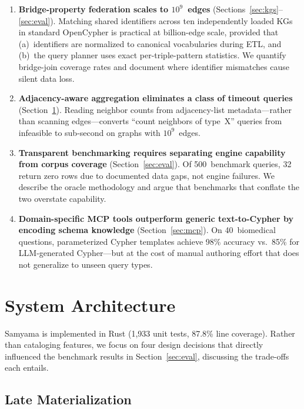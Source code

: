 \documentclass[runningheads]{llncs}
\begin{document}
\begin{enumerate}
\item \textbf{Bridge-property federation scales to $10^9$~edges}
  (Sections~\ref{sec:kgs}--\ref{sec:eval}).  Matching shared
  identifiers across ten independently loaded KGs in standard
  OpenCypher is practical at billion-edge scale, provided that
  (a)~identifiers are normalized to canonical vocabularies during
  ETL, and (b)~the query planner uses exact per-triple-pattern
  statistics.  We quantify bridge-join coverage rates and document
  where identifier mismatches cause silent data loss.

\item \textbf{Adjacency-aware aggregation eliminates a class of
  timeout queries} (Section~\ref{sec:engine}).  Reading neighbor
  counts from adjacency-list metadata---rather than scanning
  edges---converts ``count neighbors of type~X'' queries from
  infeasible to sub-second on graphs with $10^9$~edges.

\item \textbf{Transparent benchmarking requires separating engine
  capability from corpus coverage} (Section~\ref{sec:eval}).  Of
  500~benchmark queries, 32 return zero rows due to documented
  data gaps, not engine failures.  We describe the oracle
  methodology and argue that benchmarks that conflate the two
  overstate capability.

\item \textbf{Domain-specific MCP tools outperform generic
  text-to-Cypher by encoding schema knowledge}
  (Section~\ref{sec:mcp}).  On 40~biomedical questions, parameterized
  Cypher templates achieve 98\% accuracy vs.\ 85\% for LLM-generated
  Cypher---but at the cost of manual authoring effort that does not
  generalize to unseen query types.
\end{enumerate}

\section{System Architecture}\label{sec:engine}

Samyama is implemented in Rust (1,933 unit tests, 87.8\% line
coverage).  Rather than cataloging features, we focus on four
design decisions that directly influenced the benchmark results
in Section~\ref{sec:eval}, discussing the trade-offs each entails.

\subsection{Late Materialization}\label{sec:late-mat}
\end{document}
